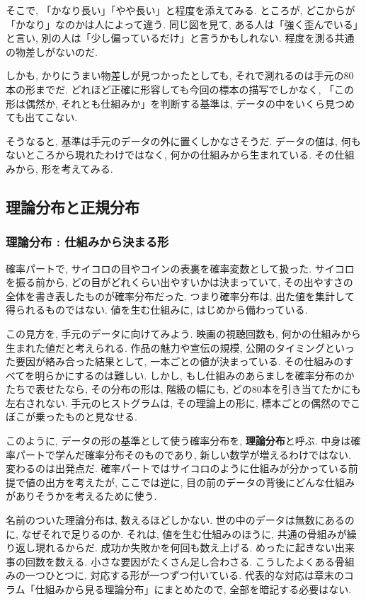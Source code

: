     そこで, 「かなり長い」「やや長い」と程度を添えてみる.
    ところが, どこからが「かなり」なのかは人によって違う.
    同じ図を見て, ある人は「強く歪んでいる」と言い, 別の人は「少し偏っているだけ」と言うかもしれない.
    程度を測る共通の物差しがないのだ.

    しかも, かりにうまい物差しが見つかったとしても, それで測れるのは手元の80本の形までだ.
    どれほど正確に形容しても今回の標本の描写でしかなく, 「この形は偶然か, それとも仕組みか」を判断する基準は, データの中をいくら見つめても出てこない.

    そうなると, 基準は手元のデータの外に置くしかなさそうだ.
    データの値は, 何もないところから現れたわけではなく, 何かの仕組みから生まれている.
    その仕組みから, 形を考えてみる.

  \subsection{理論分布と正規分布}

    \subsubsection*{理論分布 : 仕組みから決まる形}

    確率パートで, サイコロの目やコインの表裏を確率変数として扱った.
    サイコロを振る前から, どの目がどれくらい出やすいかは決まっていて, その出やすさの全体を書き表したものが確率分布だった.
    つまり確率分布は, 出た値を集計して得られるものではない.
    値を生む仕組みに, はじめから備わっている.

    この見方を, 手元のデータに向けてみよう.
    映画の視聴回数も, 何かの仕組みから生まれた値だと考えられる.
    作品の魅力や宣伝の規模, 公開のタイミングといった要因が絡み合った結果として, 一本ごとの値が決まっている.
    その仕組みのすべてを明らかにするのは難しい.
    しかし, もし仕組みのあらましを確率分布のかたちで表せたなら, その分布の形は, 階級の幅にも, どの80本を引き当てたかにも左右されない.
    手元のヒストグラムは, その理論上の形に, 標本ごとの偶然のでこぼこが乗ったものと見なせる.

    このように, データの形の基準として使う確率分布を, \textbf{理論分布}と呼ぶ.
    中身は確率パートで学んだ確率分布そのものであり, 新しい数学が増えるわけではない.
    変わるのは出発点だ.
    確率パートではサイコロのように仕組みが分かっている前提で値の出方を考えたが, ここでは逆に, 目の前のデータの背後にどんな仕組みがありそうかを考えるために使う.

    名前のついた理論分布は, 数えるほどしかない.
    世の中のデータは無数にあるのに, なぜそれで足りるのか.
    それは, 値を生む仕組みのほうに, 共通の骨組みが繰り返し現れるからだ.
    成功か失敗かを何回も数え上げる.
    めったに起きない出来事の回数を数える.
    小さな要因がたくさん足し合わさる.
    こうしたよくある骨組みの一つひとつに, 対応する形が一つずつ付いている.
    代表的な対応は章末のコラム「仕組みから見る理論分布」にまとめたので, 全部を暗記する必要はない.

